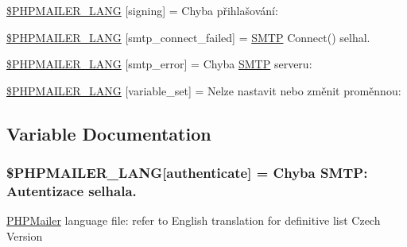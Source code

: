 \begin{DoxyCompactItemize}
\hyperlink{phpmailer_8lang-cz_8php_a68e437bdb9b968a5a67320f03d231565}{\$\+P\+H\+P\+M\+A\+I\+L\+E\+R\+\_\+\+L\+A\+NG} \mbox{[}\textquotesingle{}signing\textquotesingle{}\mbox{]} = \textquotesingle{}Chyba přihlašování\+: \textquotesingle{}
\item 
\hyperlink{phpmailer_8lang-cz_8php_a7b321d4ca1e9df702403ed4c61aa0980}{\$\+P\+H\+P\+M\+A\+I\+L\+E\+R\+\_\+\+L\+A\+NG} \mbox{[}\textquotesingle{}smtp\+\_\+connect\+\_\+failed\textquotesingle{}\mbox{]} = \textquotesingle{}\hyperlink{class_s_m_t_p}{S\+M\+TP} Connect() selhal.\textquotesingle{}
\item 
\hyperlink{phpmailer_8lang-cz_8php_a7d9cffba1e669c845f8a4c891ee50064}{\$\+P\+H\+P\+M\+A\+I\+L\+E\+R\+\_\+\+L\+A\+NG} \mbox{[}\textquotesingle{}smtp\+\_\+error\textquotesingle{}\mbox{]} = \textquotesingle{}Chyba \hyperlink{class_s_m_t_p}{S\+M\+TP} serveru\+: \textquotesingle{}
\item 
\hyperlink{phpmailer_8lang-cz_8php_af795debc7a739d038742691c358d9032}{\$\+P\+H\+P\+M\+A\+I\+L\+E\+R\+\_\+\+L\+A\+NG} \mbox{[}\textquotesingle{}variable\+\_\+set\textquotesingle{}\mbox{]} = \textquotesingle{}Nelze nastavit nebo změnit proměnnou\+: \textquotesingle{}
\end{DoxyCompactItemize}


\subsection{Variable Documentation}
\subsubsection[{\texorpdfstring{\$\+P\+H\+P\+M\+A\+I\+L\+E\+R\+\_\+\+L\+A\+NG}{$PHPMAILER_LANG}}]{\setlength{\rightskip}{0pt plus 5cm}\$P\+H\+P\+M\+A\+I\+L\+E\+R\+\_\+\+L\+A\+NG\mbox{[}\textquotesingle{}authenticate\textquotesingle{}\mbox{]} = \textquotesingle{}Chyba S\+M\+T\+P\+: Autentizace selhala.\textquotesingle{}}\hypertarget{phpmailer_8lang-cz_8php_a2cb33073c989b85580748e331ed8b4aa}{}\label{phpmailer_8lang-cz_8php_a2cb33073c989b85580748e331ed8b4aa}
\hyperlink{class_p_h_p_mailer}{P\+H\+P\+Mailer} language file\+: refer to English translation for definitive list Czech Version 

